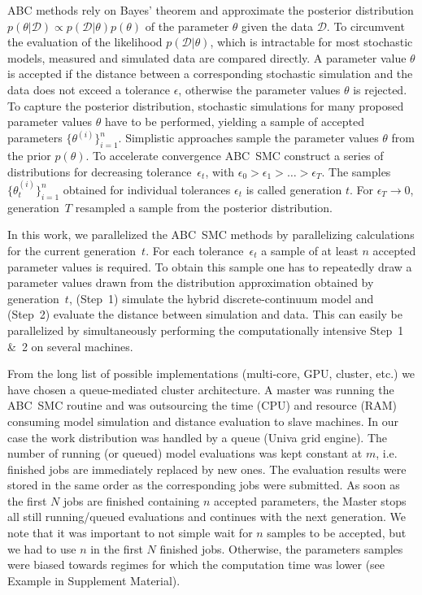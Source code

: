 \documentclass[10pt,letterpaper]{article}
\newcommand{\nj}[1]{{\color{blue}#1}}
\begin{document}
ABC methods rely on Bayes' theorem and approximate the posterior distribution $p(\theta|\mathcal{D}) \propto p(\mathcal{D}|\theta) p(\theta)$ of the parameter $\theta$ given the data $\mathcal{D}$. To circumvent the evaluation of the likelihood $p(\mathcal{D}|\theta)$, which is intractable for most stochastic models, measured and simulated data are compared directly. A parameter value $\theta$ is accepted if the distance between a corresponding stochastic simulation and the data does not exceed a tolerance $\epsilon$, otherwise the parameter values $\theta$ is rejected. To capture the posterior distribution, stochastic simulations for many proposed parameter values $\theta$ have to be performed, yielding a sample of accepted parameters $\{\theta^{(i)}\}_{i=1}^n$. Simplistic approaches sample the parameter values $\theta$ from the prior $p(\theta)$. To accelerate convergence ABC~SMC construct a series of distributions for decreasing tolerance~$\epsilon_t$, with $\epsilon_0 > \epsilon_1 > \ldots > \epsilon_T$. The samples $\{\theta_t^{(i)}\}_{i=1}^n$ obtained for individual tolerances $\epsilon_t$ is called generation $t$. For $\epsilon_T \rightarrow 0$, generation~$T$ resampled a sample from the posterior distribution.

In this work, we parallelized the ABC~SMC methods by parallelizing calculations for the current generation~$t$. For each tolerance~$\epsilon_t$ a sample of at least $n$ accepted parameter values is required. To obtain this sample one has to repeatedly draw a parameter values drawn from the distribution approximation obtained by generation~$t$, (Step~1) simulate the hybrid discrete-continuum model and (Step~2) evaluate the distance between simulation and data. This can easily be parallelized by simultaneously performing the computationally intensive Step~1 \&~2 on several machines.

From the long list of possible implementations (multi-core, GPU, cluster, etc.) we have chosen a queue-mediated cluster architecture. A master was running the ABC~SMC routine and was outsourcing the time (CPU) and resource (RAM) consuming model simulation and distance evaluation to slave machines. In our case the work distribution was handled by a queue (Univa grid engine). The number of running (or queued) model evaluations was kept constant at $m$, i.e. finished jobs are immediately replaced by new ones. The evaluation results were stored in the same order as the corresponding jobs were submitted. As soon as the first $N$ jobs are finished containing $n$ accepted parameters, the Master stops all still running/queued evaluations and continues with the next generation. We note that it was important to not simple wait for $n$ samples to be accepted, but we had to use $n$ in the first $N$ finished jobs. Otherwise, the parameters samples were biased towards regimes for which the computation time was lower \nj{(see Example in Supplement Material)}.
\end{document}
